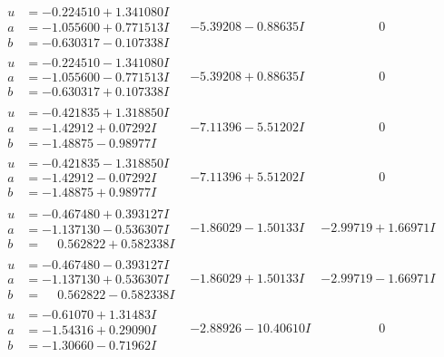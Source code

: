 \documentclass[1p]{elsarticle_modified}
\theoremstyle{definition}
\begin{document}
$$\begin{array}{c|c|c}
 \hline 
\begin{aligned}
u &= -0.224510 + 1.341080 I \\
a &= -1.055600 + 0.771513 I \\
b &= -0.630317 - 0.107338 I\end{aligned}
 & -5.39208 - 0.88635 I & \phantom{-0.000000 } 0 \\ \hline\begin{aligned}
u &= -0.224510 - 1.341080 I \\
a &= -1.055600 - 0.771513 I \\
b &= -0.630317 + 0.107338 I\end{aligned}
 & -5.39208 + 0.88635 I & \phantom{-0.000000 } 0 \\ \hline\begin{aligned}
u &= -0.421835 + 1.318850 I \\
a &= -1.42912 + 0.07292 I \\
b &= -1.48875 - 0.98977 I\end{aligned}
 & -7.11396 - 5.51202 I & \phantom{-0.000000 } 0 \\ \hline\begin{aligned}
u &= -0.421835 - 1.318850 I \\
a &= -1.42912 - 0.07292 I \\
b &= -1.48875 + 0.98977 I\end{aligned}
 & -7.11396 + 5.51202 I & \phantom{-0.000000 } 0 \\ \hline\begin{aligned}
u &= -0.467480 + 0.393127 I \\
a &= -1.137130 - 0.536307 I \\
b &= \phantom{-}0.562822 + 0.582338 I\end{aligned}
 & -1.86029 - 1.50133 I & -2.99719 + 1.66971 I \\ \hline\begin{aligned}
u &= -0.467480 - 0.393127 I \\
a &= -1.137130 + 0.536307 I \\
b &= \phantom{-}0.562822 - 0.582338 I\end{aligned}
 & -1.86029 + 1.50133 I & -2.99719 - 1.66971 I \\ \hline\begin{aligned}
u &= -0.61070 + 1.31483 I \\
a &= -1.54316 + 0.29090 I \\
b &= -1.30660 - 0.71962 I\end{aligned}
 & -2.88926 - 10.40610 I & \phantom{-0.000000 } 0 \\ \hline\begin{aligned}

\end{aligned}
\end{array}$$
\end{document}

